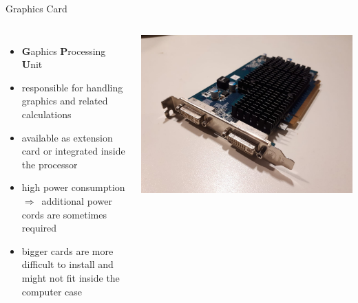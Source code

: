 \documentclass[10pt, graphics, aspectratio=169, table]{beamer}
\newcommand{\ra}{$\Rightarrow$\ }
\begin{document}
    \begin{frame}{Graphics Card}
        \begin{columns}
                \begin{itemize}
                	\item \textbf{G}aphics \textbf{P}rocessing \textbf{U}nit
                    \item responsible for handling graphics and related calculations
                    \item available as extension card or integrated inside the processor
                    \item high power consumption \ra additional power cords are sometimes required
                    \item bigger cards are more difficult to install and might not fit inside the computer case
                \end{itemize}
                \center\includegraphics[scale=0.1]{img/gpu.jpeg}
        \end{columns}
    \end{frame}
\end{document}
